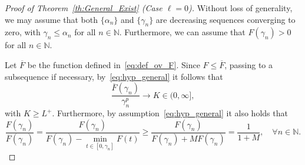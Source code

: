 \documentclass[10pt,twoside,english,reqno,a4paper]{amsart}
\theoremstyle{plain}
\theoremstyle{plain}
\theoremstyle{definition}
\theoremstyle{remark}
\numberwithin{equation}{section}
\newcommand{\N}{\mathbb{N}}
\newcommand{\oF}{\overline{F}}
\newcommand{\oL}{L^+}
\begin{document}
\begin{proof}[Proof of Theorem~\ref{th:General_Exist} (Case $\ell=0$)]
Without loss of generality, we may assume that both $\{\alpha_n\}$ and $\{\gamma_n\}$ are decreasing sequences converging to zero, with $\gamma_n \leq \alpha_n$ for all $n\in\N$. Furthermore, we can assume that $F(\gamma_n)>0$ for all $n\in\N$.

Let $\oF$ be the function defined in~\eqref{eq:def_ov_F}. Since $F\leq \oF$, passing to a subsequence if necessary, by~\eqref{eq:hyp_general} it follows that
\begin{equation}
\label{eq:Pf_small_1}
\frac{\oF(\gamma_n)}{\gamma_n^p} \to K\in (0,\infty],
\end{equation}
with $K\geq \oL$. Furthermore, by assumption~\eqref{eq:hyp_general} it also holds that
\begin{equation}
\label{eq:Pf_small_2}
\frac{F(\gamma_n)}{\oF(\gamma_n)} = \frac{F(\gamma_n)}{F(\gamma_n)- \min_{t\in[0,\gamma_n]} F(t)} \geq \frac{F(\gamma_n)}{F(\gamma_n) + M F(\gamma_n)} = \frac{1}{1+M},\quad \forall n\in\N.
\end{equation}


\end{proof}
\end{document}
